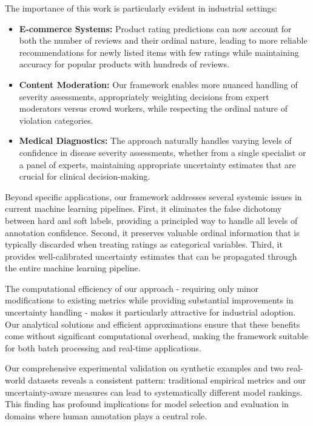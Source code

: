 \documentclass[journal]{IEEEtran}
\begin{document}
The importance of this work is particularly evident in industrial settings:

\begin{itemize}
\item \textbf{E-commerce Systems:} Product rating predictions can now account for both the number of reviews and their ordinal nature, leading to more reliable recommendations for newly listed items with few ratings while maintaining accuracy for popular products with hundreds of reviews.

\item \textbf{Content Moderation:} Our framework enables more nuanced handling of severity assessments, appropriately weighting decisions from expert moderators versus crowd workers, while respecting the ordinal nature of violation categories.

\item \textbf{Medical Diagnostics:} The approach naturally handles varying levels of confidence in disease severity assessments, whether from a single specialist or a panel of experts, maintaining appropriate uncertainty estimates that are crucial for clinical decision-making.
\end{itemize}

Beyond specific applications, our framework addresses several systemic issues in current machine learning pipelines. First, it eliminates the false dichotomy between hard and soft labels, providing a principled way to handle all levels of annotation confidence. Second, it preserves valuable ordinal information that is typically discarded when treating ratings as categorical variables. Third, it provides well-calibrated uncertainty estimates that can be propagated through the entire machine learning pipeline.

The computational efficiency of our approach - requiring only minor modifications to existing metrics while providing substantial improvements in uncertainty handling - makes it particularly attractive for industrial adoption. Our analytical solutions and efficient approximations ensure that these benefits come without significant computational overhead, making the framework suitable for both batch processing and real-time applications.

Our comprehensive experimental validation on synthetic examples and two real-world datasets reveals a consistent pattern: traditional empirical metrics and our uncertainty-aware measures can lead to systematically different model rankings. This finding has profound implications for model selection and evaluation in domains where human annotation plays a central role.
\end{document}
